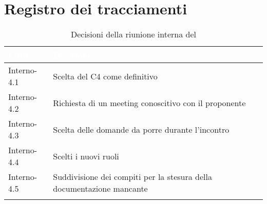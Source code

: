\section{Registro dei tracciamenti}
{

\renewcommand{\arraystretch}{1.5}
\centering
\begin{longtable}{C{3cm} C{9cm}}
\textcolor{white}{\textbf{Codice}}&
\textcolor{white}{\textbf{Decisione}}\\	
\endhead
		
Interno-4.1 & Scelta del  C4 come definitivo\\

Interno-4.2 & Richiesta di un meeting conoscitivo con il proponente\\

Interno-4.3 & Scelta delle domande da porre durante l'incontro\\

Interno-4.4 & Scelti i nuovi ruoli\\

Interno-4.5 & Suddivisione dei compiti per la stesura della documentazione mancante\\
		
\caption{Decisioni della riunione interna del \Data{}}
\end{longtable}
}
